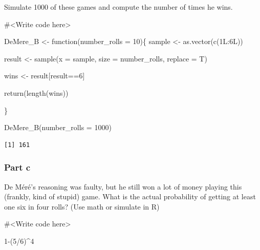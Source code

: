 \documentclass[
  letterpaper,
  DIV=11,
  numbers=noendperiod]{scrartcl}
\newenvironment{Shaded}{\begin{snugshade}}{\end{snugshade}}
\newcommand{\AttributeTok}[1]{\textcolor[rgb]{0.40,0.45,0.13}{#1}}
\newcommand{\CommentTok}[1]{\textcolor[rgb]{0.37,0.37,0.37}{#1}}
\newcommand{\ControlFlowTok}[1]{\textcolor[rgb]{0.00,0.23,0.31}{#1}}
\newcommand{\DecValTok}[1]{\textcolor[rgb]{0.68,0.00,0.00}{#1}}
\newcommand{\FunctionTok}[1]{\textcolor[rgb]{0.28,0.35,0.67}{#1}}
\newcommand{\NormalTok}[1]{\textcolor[rgb]{0.00,0.23,0.31}{#1}}
\newcommand{\OtherTok}[1]{\textcolor[rgb]{0.00,0.23,0.31}{#1}}
\newcommand{\SpecialCharTok}[1]{\textcolor[rgb]{0.37,0.37,0.37}{#1}}
\begin{document}
Simulate 1000 of these games and compute the number of times he wins.

\begin{Shaded}
\begin{Highlighting}[]
\CommentTok{\#\textless{}Write code here\textgreater{}}


\NormalTok{DeMere\_B }\OtherTok{\textless{}{-}} \ControlFlowTok{function}\NormalTok{(}\AttributeTok{number\_rolls =} \DecValTok{10}\NormalTok{)\{}
\NormalTok{  sample }\OtherTok{\textless{}{-}} \FunctionTok{as.vector}\NormalTok{(}\FunctionTok{c}\NormalTok{(1L}\SpecialCharTok{:}\NormalTok{6L))}
  
\NormalTok{    result }\OtherTok{\textless{}{-}} \FunctionTok{sample}\NormalTok{(}\AttributeTok{x =}\NormalTok{ sample, }\AttributeTok{size =}\NormalTok{ number\_rolls, }
                         \AttributeTok{replace =}\NormalTok{ T)}
    
\NormalTok{    wins }\OtherTok{\textless{}{-}}\NormalTok{ result[result}\SpecialCharTok{==}\DecValTok{6}\NormalTok{]}
    
    \FunctionTok{return}\NormalTok{(}\FunctionTok{length}\NormalTok{(wins))}
    
\NormalTok{\}}

\FunctionTok{DeMere\_B}\NormalTok{(}\AttributeTok{number\_rolls =} \DecValTok{1000}\NormalTok{)}
\end{Highlighting}
\end{Shaded}

\begin{verbatim}
[1] 161
\end{verbatim}

\hypertarget{part-c-3}{%
\subsubsection{Part c}\label{part-c-3}}

De Méré's reasoning was faulty, but he still won a lot of money playing
this (frankly, kind of stupid) game. What is the actual probability of
getting at least one six in four rolls? (Use math or simulate in R)

\begin{Shaded}
\begin{Highlighting}[]
\CommentTok{\#\textless{}Write code here\textgreater{}}

\DecValTok{1}\SpecialCharTok{{-}}\NormalTok{(}\DecValTok{5}\SpecialCharTok{/}\DecValTok{6}\NormalTok{)}\SpecialCharTok{\^{}}\DecValTok{4}
\end{Highlighting}
\end{Shaded}
\end{document}
